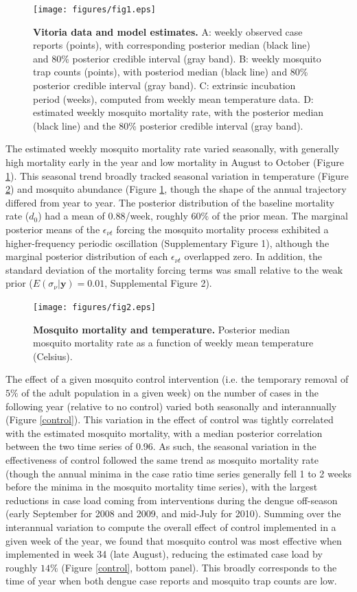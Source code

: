 \documentclass[10pt,letterpaper]{article}
\begin{document}
\begin{figure}[!h]
\texttt{[image: figures/fig1.eps]}
\caption{{\bf Vitoria data and model estimates.}
A: weekly observed case reports (points), with corresponding posterior median (black line) and 80\% posterior credible interval (gray band). B: weekly mosquito trap counts (points), with posteriod median (black line) and 80\% posterior credible interval (gray band). C: extrinsic incubation period (weeks), computed from weekly mean temperature data. D: estimated weekly mosquito mortality rate, with the posterior median (black line) and the 80\% posterior credible interval (gray band).
}
\label{timeseries}
\end{figure}

The estimated weekly mosquito mortality rate varied seasonally, with generally high mortality early in the year and low mortality in August to October (Figure \ref{timeseries}).
This seasonal trend broadly tracked seasonal variation in temperature (Figure \ref{mortality}) and mosquito abundance (Figure \ref{timeseries}, though the shape of the annual trajectory differed from year to year.
The posterior distribution of the baseline mortality rate ($d_0$) had a mean of 0.88/week, roughly $60\%$ of the prior mean.
The marginal posterior means of the $\epsilon_{\nu t}$ forcing the mosquito mortality process exhibited a higher-frequency periodic oscillation (Supplementary Figure 1), although the marginal posterior distribution of each $\epsilon_{\nu t}$ overlapped zero.
In addition, the standard deviation of the mortality forcing terms was small relative to the weak prior ($E(\sigma_{\nu}|\mathbf{y}) = 0.01$, Supplemental Figure 2).

\begin{figure}[!h]
\texttt{[image: figures/fig2.eps]}
\caption{{\bf Mosquito mortality and temperature.}
Posterior median mosquito mortality rate as a function of weekly mean temperature (Celsius).
}
\label{mortality}
\end{figure}

The effect of a given mosquito control intervention (i.e. the temporary removal of $5\%$ of the adult population in a given week) on the number of cases in the following year (relative to no control) varied both seasonally and interannually (Figure \ref{control}).
This variation in the effect of control was tightly correlated with the estimated mosquito mortality, with a median posterior correlation between the two time series of 0.96.
As such, the seasonal variation in the effectiveness of control followed the same trend as mosquito mortality rate (though the annual minima in the case ratio time series generally fell 1 to 2 weeks before the minima in the mosquito mortality time series), with the largest reductions in case load coming from interventions during the dengue off-season (early September for 2008 and 2009, and mid-July for 2010).
Summing over the interannual variation to compute the overall effect of control implemented in a given week of the year, we found that mosquito control was most effective when implemented in week 34 (late August), reducing the estimated case load by roughly $14\%$ (Figure \ref{control}, bottom panel).
This broadly corresponds to the time of year when both dengue case reports and mosquito trap counts are low.
\end{document}
